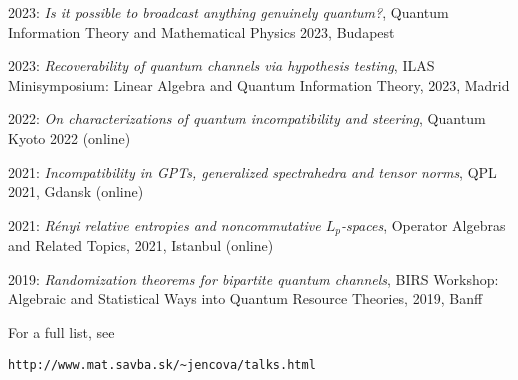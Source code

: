 \documentclass[12pt]{article}
\begin{document}
\begin{description}[noitemsep,leftmargin=1.3cm, font=\normalfont]
\item{2023:} \emph{Is it possible to broadcast anything genuinely quantum?}, Quantum
Information Theory and Mathematical Physics 2023, Budapest
\item{2023:} \emph{Recoverability of quantum channels via hypothesis testing}, ILAS
Minisymposium: Linear Algebra and Quantum Information Theory,  2023, Madrid

\item{2022:} \emph{ On characterizations of quantum incompatibility and steering}, Quantum Kyoto 2022 (online)

\item{2021:} \emph{Incompatibility in GPTs, generalized spectrahedra and tensor norms},
QPL 2021, Gdansk (online)

\item{2021:} \emph{ Rényi relative entropies and noncommutative $L_p$-spaces}, Operator
Algebras and Related Topics, 2021, Istanbul (online)

\item{2019:} \emph{Randomization theorems for bipartite quantum channels}, BIRS Workshop:
Algebraic and Statistical Ways into Quantum Resource Theories, 2019, Banff 

\item{For a full list, see}
\begin{verbatim}http://www.mat.savba.sk/~jencova/talks.html\end{verbatim}


\end{description}
\end{document}
